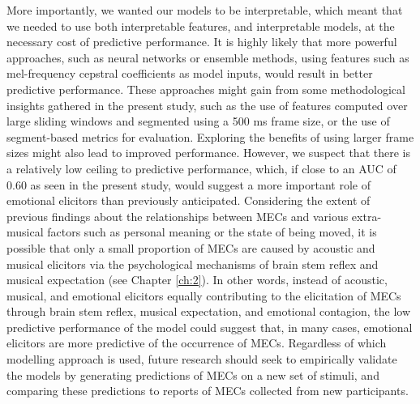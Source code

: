 More importantly, we wanted our models to be interpretable, which meant that we needed to use both interpretable features, and interpretable models, at the necessary cost of predictive performance. It is highly likely that more powerful approaches, such as neural networks or ensemble methods, using features such as mel-frequency cepstral coefficients as model inputs, would result in better predictive performance. These approaches might gain from some methodological insights gathered in the present study, such as the use of features computed over large sliding windows and segmented using a 500 ms frame size, or the use of segment-based metrics for evaluation. Exploring the benefits of using larger frame sizes might also lead to improved performance. However, we suspect that there is a relatively low ceiling to predictive performance, which, if close to an AUC of 0.60 as seen in the present study, would suggest a more important role of emotional elicitors than previously anticipated. Considering the extent of previous findings about the relationships between MECs and various extra-musical factors such as personal meaning or the state of being moved, it is possible that only a small proportion of MECs are caused by acoustic and musical elicitors via the psychological mechanisms of brain stem reflex and musical expectation (see Chapter \ref{ch:2}). In other words, instead of acoustic, musical, and emotional elicitors equally contributing to the elicitation of MECs through brain stem reflex, musical expectation, and emotional contagion, the low predictive performance of the model could suggest that, in many cases, emotional elicitors are more predictive of the occurrence of MECs. Regardless of which modelling approach is used, future research should seek to empirically validate the models by generating predictions of MECs on a new set of stimuli, and comparing these predictions to reports of MECs collected from new participants.


